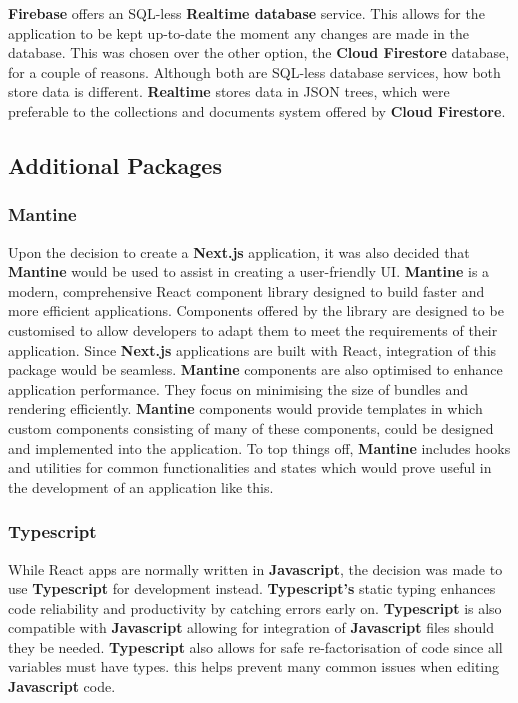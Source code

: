\documentclass{l4proj}
\begin{document}
\textbf{Firebase} offers an SQL-less \textbf{Realtime database} service. This allows for the application to be kept up-to-date the moment any changes are made in the database. This was chosen over the other option,  the \textbf{Cloud Firestore} database,  for a couple of reasons. Although both are SQL-less database services,  how both store data is different. \textbf{Realtime} stores data in JSON trees,  which were preferable to the collections and documents system offered by \textbf{Cloud Firestore}.

\subsection{Additional Packages}
\subsubsection{Mantine}
Upon the decision to create a \textbf{Next.js} application,  it was also decided that \textbf{Mantine} would be used to assist in creating a user-friendly UI. \textbf{Mantine} is a modern,  comprehensive React component library designed to build faster and more efficient applications. Components offered by the library are designed to be customised to allow developers to adapt them to meet the requirements of their application. Since \textbf{Next.js} applications are built with React,  integration of this package would be seamless. \textbf{Mantine} components are also optimised to enhance application performance. They focus on minimising the size of bundles and rendering efficiently. \textbf{Mantine} components would provide templates in which custom components consisting of many of these components,  could be designed and implemented into the application. To top things off,  \textbf{Mantine} includes hooks and utilities for common functionalities and states which would prove useful in the development of an application like this.

\subsubsection{Typescript}
While React apps are normally written in \textbf{Javascript},  the decision was made to use \textbf{Typescript} for development instead. \textbf{Typescript's} static typing enhances code reliability and productivity by catching errors early on. \textbf{Typescript} is also compatible with \textbf{Javascript} allowing for integration of \textbf{Javascript} files should they be needed. \textbf{Typescript} also allows for safe re-factorisation of code since all variables must have types. this helps prevent many common issues when editing \textbf{Javascript} code.
\end{document}
